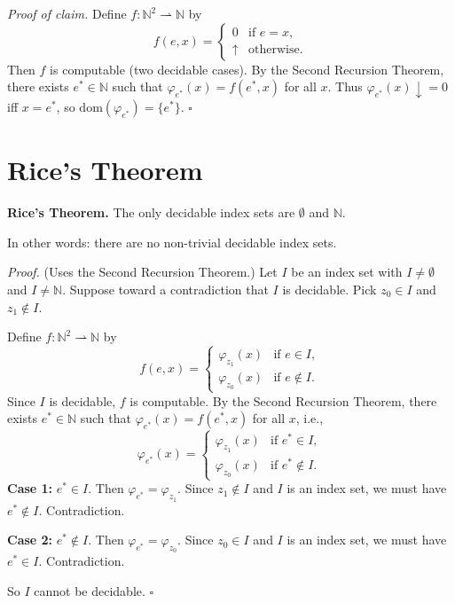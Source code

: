 \documentclass[11pt]{article}
\begin{document}
\textit{Proof of claim.} Define $f\colon \mathbb{N}^2 \rightharpoonup \mathbb{N}$ by
\[
    f(e, x) = \begin{cases} 0 & \text{if } e = x, \\ {\uparrow} & \text{otherwise}. \end{cases}
\]
Then $f$ is computable (two decidable cases). By the Second Recursion Theorem, there exists $e^* \in \mathbb{N}$ such that $\varphi_{e^*}(x) = f(e^*, x)$ for all $x$. Thus $\varphi_{e^*}(x)\downarrow = 0$ iff $x = e^*$, so $\mathrm{dom}(\varphi_{e^*}) = \{e^*\}$. \hfill$\square$

\section{Rice's Theorem}

\textbf{Rice's Theorem.} The only decidable index sets are $\emptyset$ and $\mathbb{N}$.

In other words: there are no non-trivial decidable index sets.

\textit{Proof.} (Uses the Second Recursion Theorem.) Let $I$ be an index set with $I \neq \emptyset$ and $I \neq \mathbb{N}$. Suppose toward a contradiction that $I$ is decidable. Pick $z_0 \in I$ and $z_1 \notin I$.

Define $f\colon \mathbb{N}^2 \rightharpoonup \mathbb{N}$ by
\[
    f(e, x) = \begin{cases}
        \varphi_{z_1}(x) & \text{if } e \in I, \\
        \varphi_{z_0}(x) & \text{if } e \notin I.
    \end{cases}
\]
Since $I$ is decidable, $f$ is computable. By the Second Recursion Theorem, there exists $e^* \in \mathbb{N}$ such that $\varphi_{e^*}(x) = f(e^*, x)$ for all $x$, i.e.,
\[
    \varphi_{e^*}(x) = \begin{cases}
        \varphi_{z_1}(x) & \text{if } e^* \in I, \\
        \varphi_{z_0}(x) & \text{if } e^* \notin I.
    \end{cases}
\]
\textbf{Case 1:} $e^* \in I$. Then $\varphi_{e^*} = \varphi_{z_1}$. Since $z_1 \notin I$ and $I$ is an index set, we must have $e^* \notin I$. Contradiction.

\textbf{Case 2:} $e^* \notin I$. Then $\varphi_{e^*} = \varphi_{z_0}$. Since $z_0 \in I$ and $I$ is an index set, we must have $e^* \in I$. Contradiction.

So $I$ cannot be decidable. \hfill$\square$
\end{document}
